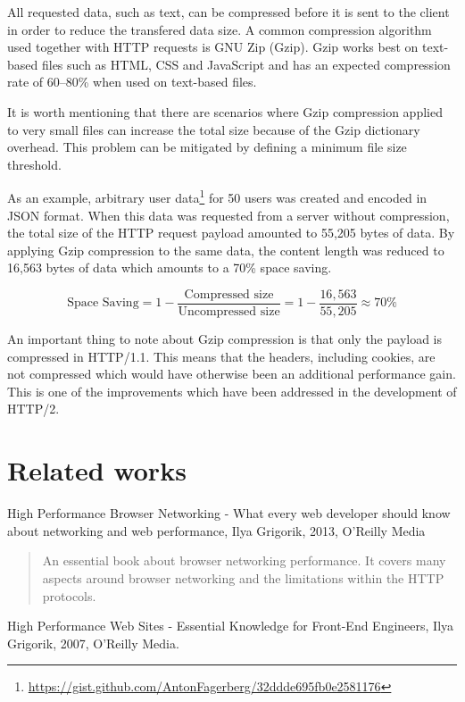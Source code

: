 \documentclass{cslthse-msc}
\begin{document}
All requested data, such as text, can be compressed before it is sent to the client in order to reduce the transfered data size. A common compression algorithm used together with HTTP requests is GNU Zip (Gzip). Gzip works best on text-based files such as HTML, CSS and JavaScript and has an expected compression rate of 60--80\% when used on text-based files\cite[page 237]{HPBN}.

It is worth mentioning that there are scenarios where Gzip compression applied to very small files can increase the total size because of the Gzip dictionary overhead. This problem can be mitigated by defining a minimum file size threshold\cite{google_gzip}.

As an example, arbitrary user data\footnote{\url{https://gist.github.com/AntonFagerberg/32ddde695fb0e2581176}} for 50 users was created and encoded in JSON format. When this data was requested from a server without compression, the total size of the HTTP request payload amounted to 55,205 bytes of data. By applying Gzip compression to the same data, the content length was reduced to 16,563 bytes of data which amounts to a 70\% space saving. 

\begin{equation}
\mbox{Space Saving} = 1 - \frac{\mbox{Compressed size}}{\mbox{Uncompressed size}} = 1 - \frac{16,563}{55,205} \approx 70\%
\end{equation}

An important thing to note about Gzip compression is that only the payload is compressed in HTTP/1.1\cite{header_compression}. This means that the headers, including cookies, are not compressed which would have otherwise been an additional performance gain. This is one of the improvements which have been addressed in the development of HTTP/2\cite[page 222]{HPBN}.

\section{Related works}
High Performance Browser Networking - What every web developer should know about networking and web performance, Ilya Grigorik, 2013, O'Reilly Media

\begin{quote}
	An essential book about browser networking performance. It covers many aspects around browser networking and the limitations within the HTTP protocols.
\end{quote}

\vspace{5mm}
\noindent High Performance Web Sites - Essential Knowledge for Front-End Engineers, Ilya Grigorik, 2007, O'Reilly Media.
\end{document}

